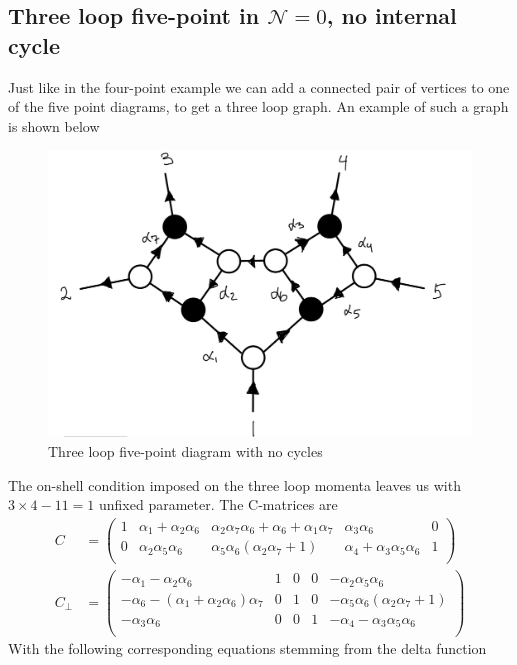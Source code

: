 \documentclass[letter,11pt]{article}
\begin{document}
\subsection{Three loop five-point in $\mathcal{N}=0$, no internal cycle}
Just like in the four-point example we can add a connected pair of vertices to one of the five point diagrams, to get a three loop graph. An example of such a graph is shown below
\begin{figure}[H]
	\centering
	\includegraphics[width=0.5\linewidth]{5pt3l}
	\caption{Three loop five-point diagram with no cycles}
	\label{fig:5pt3l_1}
\end{figure}
\noindent The on-shell condition imposed on the three loop momenta leaves us with $3\times 4-11=1$ unfixed parameter. The C-matrices are
\begin{equation}
	\begin{aligned}
		C&=\left(
		\begin{array}{ccccc}
			1 & \alpha _1+\alpha _2 \alpha _6 & \alpha _2 \alpha _7 \alpha _6+\alpha _6+\alpha _1 \alpha _7 & \alpha _3 \alpha _6 & 0 \\
			0 & \alpha _2 \alpha _5 \alpha _6 & \alpha _5 \alpha _6 \left(\alpha _2 \alpha _7+1\right) & \alpha _4+\alpha _3 \alpha _5 \alpha _6 & 1 \\
		\end{array}
		\right)\\
		C_\perp&=\left(
		\begin{array}{ccccc}
			-\alpha _1-\alpha _2 \alpha _6 & 1 & 0 & 0 & -\alpha _2 \alpha _5 \alpha _6 \\
			-\alpha _6-\left(\alpha _1+\alpha _2 \alpha _6\right) \alpha _7 & 0 & 1 & 0 & -\alpha _5 \alpha _6 \left(\alpha _2 \alpha _7+1\right) \\
			-\alpha _3 \alpha _6 & 0 & 0 & 1 & -\alpha _4-\alpha _3 \alpha _5 \alpha _6 \\
		\end{array}
		\right)
	\end{aligned}
\end{equation}
With the following corresponding equations stemming from the delta function
\end{document}
